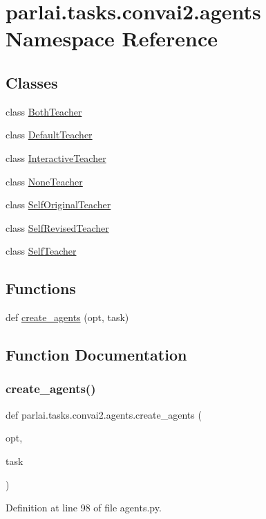 \hypertarget{namespaceparlai_1_1tasks_1_1convai2_1_1agents}{}\section{parlai.\+tasks.\+convai2.\+agents Namespace Reference}
\label{namespaceparlai_1_1tasks_1_1convai2_1_1agents}
\subsection*{Classes}
\begin{DoxyCompactItemize}
\item 
class \hyperlink{classparlai_1_1tasks_1_1convai2_1_1agents_1_1BothTeacher}{Both\+Teacher}
\item 
class \hyperlink{classparlai_1_1tasks_1_1convai2_1_1agents_1_1DefaultTeacher}{Default\+Teacher}
\item 
class \hyperlink{classparlai_1_1tasks_1_1convai2_1_1agents_1_1InteractiveTeacher}{Interactive\+Teacher}
\item 
class \hyperlink{classparlai_1_1tasks_1_1convai2_1_1agents_1_1NoneTeacher}{None\+Teacher}
\item 
class \hyperlink{classparlai_1_1tasks_1_1convai2_1_1agents_1_1SelfOriginalTeacher}{Self\+Original\+Teacher}
\item 
class \hyperlink{classparlai_1_1tasks_1_1convai2_1_1agents_1_1SelfRevisedTeacher}{Self\+Revised\+Teacher}
\item 
class \hyperlink{classparlai_1_1tasks_1_1convai2_1_1agents_1_1SelfTeacher}{Self\+Teacher}
\end{DoxyCompactItemize}
\subsection*{Functions}
\begin{DoxyCompactItemize}
\item 
def \hyperlink{namespaceparlai_1_1tasks_1_1convai2_1_1agents_a0c9209b5a7c832ac11a43d91ee7929f0}{create\+\_\+agents} (opt, task)
\end{DoxyCompactItemize}


\subsection{Function Documentation}
\mbox{\label{namespaceparlai_1_1tasks_1_1convai2_1_1agents_a0c9209b5a7c832ac11a43d91ee7929f0}} 
\subsubsection{\texorpdfstring{create\+\_\+agents()}{create\_agents()}}
{\footnotesize\ttfamily def parlai.\+tasks.\+convai2.\+agents.\+create\+\_\+agents (\begin{DoxyParamCaption}\item[{}]{opt,  }\item[{}]{task }\end{DoxyParamCaption})}



Definition at line 98 of file agents.\+py.

